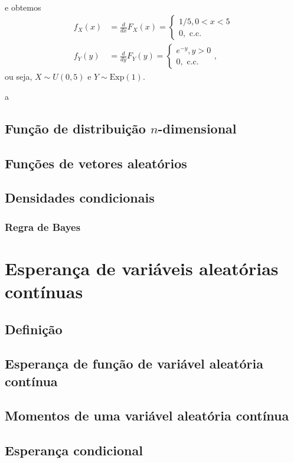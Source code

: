 \documentclass[../Notas.tex]{subfiles}
\begin{document}
\begin{example}
\begin{align*}
\end{align*}
e obtemos
\begin{align*}
    f_X(x) &= \frac{d}{dx}F_X(x) = \begin{cases}
    1/5, 0 < x < 5 \\
    0, \text{ c.c.}
    \end{cases} \\
    f_Y(y) &= \frac{d}{dy}F_Y(y) = \begin{cases}
    e^{-y}, y > 0 \\
    0, \text{ c.c.}
    \end{cases},
\end{align*}
ou seja, $X\sim U(0,5)$ e $Y\sim\text{Exp}(1)$.
\end{example}

\begin{example}
a
\end{example}



\subsection{Função de distribuição $n$-dimensional}

\subsection{Funções de vetores aleatórios}

\subsection{Densidades condicionais}

\subsubsection{Regra de Bayes}

\section{Esperança de variáveis aleatórias contínuas}

\subsection{Definição}

\subsection{Esperança de função de variável aleatória contínua}

\subsection{Momentos de uma variável aleatória contínua}

\subsection{Esperança condicional}
\end{document}
